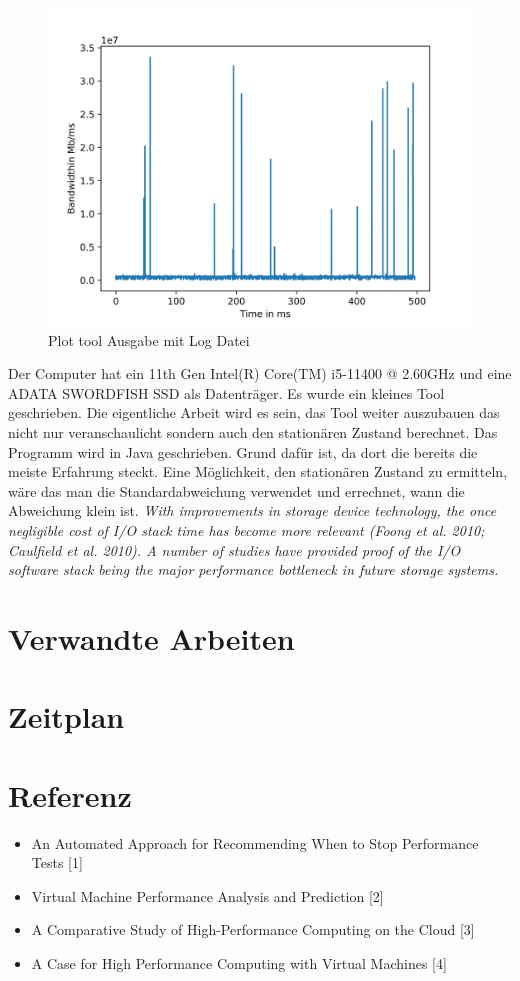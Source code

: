 \documentclass{article}
\begin{document}
\begin{figure}[ht!]
    \centering
    \includegraphics[width=120mm]{./Code/nm_mytest_bw.jpg}
    \caption{Plot tool Ausgabe mit Log Datei  \label{overflow}}
\end{figure}
Der Computer hat ein 11th Gen Intel(R) Core(TM) i5-11400 @ 2.60GHz und eine ADATA SWORDFISH SSD als Datenträger.
Es wurde ein kleines Tool geschrieben. Die eigentliche Arbeit wird es sein, das Tool weiter auszubauen das nicht nur veranschaulicht
sondern auch den stationären Zustand berechnet. Das Programm wird in Java geschrieben. Grund dafür ist, da dort die bereits die meiste Erfahrung steckt.
Eine Möglichkeit, den stationären Zustand zu ermitteln, wäre das man die Standardabweichung verwendet und errechnet, wann die Abweichung klein ist.
\textit{With improvements in storage device technology, the once negligible cost of I/O stack time has become more relevant (Foong et al. 2010; Caulfield et al. 2010). A number
of studies have provided proof of the I/O software stack being the major performance bottleneck in future storage systems.}
\section{Verwandte Arbeiten}
\section{Zeitplan}
\section{Referenz}
\begin{itemize}
    \item An Automated Approach for Recommending When to Stop Performance Tests [1]
    \item Virtual Machine Performance Analysis and Prediction [2]
    \item A Comparative Study of High-Performance Computing on the Cloud [3]
    \item A Case for High Performance Computing with Virtual Machines [4]
\end{itemize}
\end{document}
